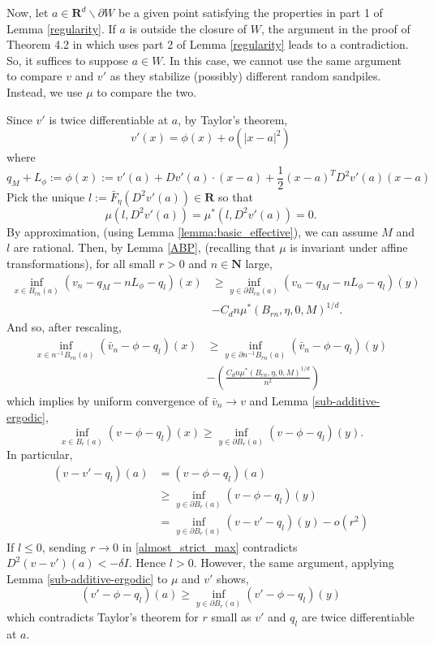 \documentclass[12pt]{amsart}
\newcommand{\R}{\mathbf{R}}
\newcommand{\N}{\mathbf{N}}
\begin{document}
Now, let $a \in \R^d \backslash \partial W$ be a given point satisfying the properties in part 1 of Lemma \ref{regularity}. 
If $a$ is outside the closure of $W$, the argument in the proof of Theorem 4.2 in \cite{pegden2013convergence} which uses part 2 of Lemma \ref{regularity} leads to a contradiction. So, it suffices to suppose $a \in W$. 
In this case, we cannot use the same argument to compare $v$ and $v'$ as they stabilize (possibly) different random sandpiles. Instead, we use $\mu$ to compare the two. 


Since $v'$ is twice differentiable at $a$, by Taylor's theorem, 
\[
v'(x) = \phi(x) + o(|x-a|^2)
\]
where 
\[
q_M + L_{\phi} := \phi(x) := v'(a) + D v'(a) \cdot (x - a) +  \frac{1}{2} (x - a)^T D^2 v'(a)(x - a)
\]
Pick the unique $l := \bar{F}_{\eta}(D^2 v'(a)) \in \R$ so that 
\[
\mu(l, D^2 v'(a)) = \mu^*(l, D^2 v'(a)) = 0.
\]
By approximation, (using Lemma \ref{lemma:basic_effective}), we can assume $M$ and $l$ are rational. Then, by Lemma \ref{ABP}, (recalling that $\mu$ is invariant under affine transformations), for all small $r > 0$
and $n \in \N$ large,
\begin{align*}
\inf_{x \in B_{r n}(a)}  \left( v_n  - q_M - n L_\phi -q_l \right)(x) &\geq \inf_{y \in \partial B_{r n}(a)} \left( v_n  - q_M - n L_\phi - q_l \right)(y) \\
&- C_d n \mu^*(B_{r n}, \eta, 0, M)^{1/d}.
\end{align*}
And so, after rescaling, 
\begin{align*}
\inf_{x \in n^{-1} B_{r n}(a)} \left( \bar{v}_n  - \phi - q_l \right)(x) &\geq \inf_{y \in \partial n^{-1} B_{r n}(a)} \left( \bar{v}_n  - \phi - q_l \right)(y) \\
&- \left( \frac{C_d n \mu^*(B_{r n}, \eta, 0, M)^{1/d} }{n^2}\right)
\end{align*}
which implies by uniform convergence of $\bar{v}_n \to v$ and Lemma \ref{sub-additive-ergodic},
\[
\inf_{x \in B_r^{}(a)} \left( v- \phi - q_l \right)(x) \geq \inf_{y \in \partial B_{r} (a) } \left( v - \phi - q_l \right)(y). 
\]
In particular, 
\begin{align} \label{almost_strict_max}
(v - v' - q_l)(a)  &= (v - \phi - q_l)(a) \\ \nonumber
&\geq \inf_{y \in \partial B_{r} (a) } \left( v - \phi - q_l \right)(y)  \\ \nonumber
&=  \inf_{y \in \partial B_{r} (a) } \left( v - v' - q_l \right)(y)  - o(r^2) \nonumber
\end{align}
If $l \leq 0$, sending $r \to 0$ in \eqref{almost_strict_max} contradicts $D^2(v-v')(a) < -\delta I$. Hence $l > 0$. However, the same argument, applying Lemma \ref{sub-additive-ergodic} to $\mu$ and $v'$ shows, 
\[
(v' - \phi - q_l)(a) \geq  \inf_{y \in \partial B_{r}(a)} (v' -\phi-q_l)(y) 
\]
which contradicts Taylor's theorem for $r$ small as $v'$ and $q_l$ are twice differentiable at $a$. 
\end{document}

